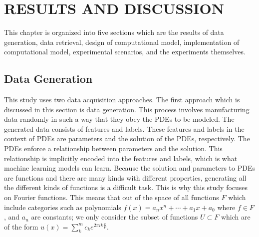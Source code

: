 \chapter{RESULTS AND DISCUSSION}\label{ch:results_and_discussion}
\noindent This chapter is organized into five sections which are the results of data generation, data retrieval, design of computational model, implementation of computational model, experimental scenarios, and the experiments themselves.

\section{Data Generation}\label{sec:data_generation}
\noindent This study uses two data acquisition approaches. The first approach which is discussed in this section is data generation. This process involves manufacturing data randomly in such a way that they obey the PDEs to be modeled. The generated data consists of features and labels. These features and labels in the context of PDEs are parameters and the solution of the PDEs, respectively. The PDEs enforce a relationship between parameters and the solution. This relationship is implicitly encoded into the features and labels, which is what machine learning models can learn. Because the solution and parameters to PDEs are functions and there are many kinds with different properties, generating all the different kinds of functions is a difficult task. This is why this study focuses on Fourier functions. This means that out of the space of all functions \(F \) which include categories such as polynomials \(f\left(x\right)=a_{n}x^n+\cdots+a_1x+a_0\) where \(f\in F\), and \(a_n\) are constants; we only consider the subset of functions \(U \subset F\) which are of the form \(u\left(x\right)=\sum_{k}^{m}c_k e^{2\pi i k \frac{x}{P}}\).

